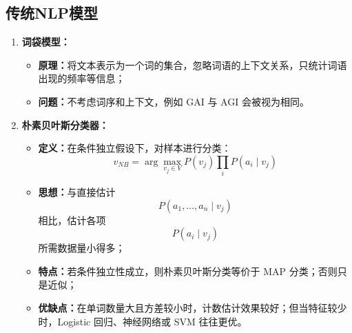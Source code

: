 \documentclass[../main.tex]{subfiles}
\begin{document}
\subsection{传统NLP模型}
\begin{enumerate}
    \item \textbf{词袋模型：}
    \begin{itemize}
        \item \textbf{原理：}将文本表示为一个词的集合，忽略词语的上下文关系，只统计词语出现的频率等信息；
        \item \textbf{问题：}不考虑词序和上下文，例如 GAI 与 AGI 会被视为相同。
    \end{itemize}

    \item \textbf{朴素贝叶斯分类器：}
    \begin{itemize}
        \item \textbf{定义：}在条件独立假设下，对样本进行分类：
        $$
        v_{NB}=\arg\max_{v_j\in V} P(v_j)\prod_i P(a_i\mid v_j)
        $$
        \item \textbf{思想：}与直接估计
        $$
        P(a_1,\ldots,a_n\mid v_j)
        $$
        相比，估计各项
        $$
        P(a_i\mid v_j)
        $$
        所需数据量小得多；
        \item \textbf{特点：}若条件独立性成立，则朴素贝叶斯分类等价于 MAP 分类；否则只是近似；
        \item \textbf{优缺点：}在单词数量大且方差较小时，计数估计效果较好；但当特征较少时，Logistic 回归、神经网络或 SVM 往往更优。
    \end{itemize}


\end{enumerate}
\end{document}
